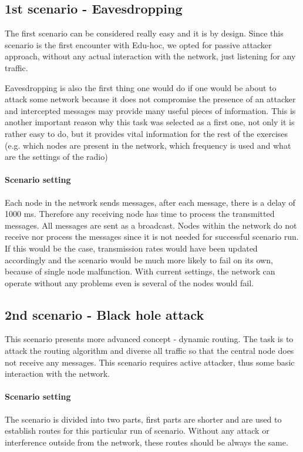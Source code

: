\documentclass[
  print, %
  Table,   %
  nolof,     %
  nolot,     %
           oneside
]{fithesis3}
\begin{document}
    \subsection{1st scenario - Eavesdropping}\label{subsec:1st}
    The first scenario can be considered really easy and it is by design. Since this scenario is the first encounter with Edu-hoc, we opted for passive attacker approach, without any actual interaction with the network, just listening for any traffic.

    Eavesdropping is also the first thing one would do if one would be about to attack some network because it does not compromise the presence of an attacker and intercepted messages may provide many useful pieces of information. This is another important reason why this task was selected as a first one, not only it is rather easy to do, but it provides vital information for the rest of the exercises (e.g. which nodes are present in the network, which frequency is used and what are the settings of the radio)

    \paragraph{Scenario setting}
    Each node in the network sends messages, after each message, there is a delay of 1000 ms. Therefore any receiving node has time to process the transmitted messages. All messages are sent as a broadcast. Nodes within the network do not receive nor process the messages since it is not needed for successful scenario run. If this would be the case, transmission rates would have been updated accordingly and the scenario would be much more likely to fail on its own, because of single node malfunction. With current settings, the network can operate without any problems even is several of the nodes would fail.


    \subsection{2nd scenario - Black hole attack} \label{subsec:2nd}
    This scenario presents more advanced concept - dynamic routing. The task is to attack the routing algorithm and diverse all traffic so that the central node does not receive any messages. This scenario requires active attacker, thus some basic interaction with the network.

    \paragraph{Scenario setting}
    The scenario is divided into two parts, first parts are shorter and are used to establish routes for this particular run of scenario. Without any attack or interference outside from the network, these routes should be always the same.
\end{document}

